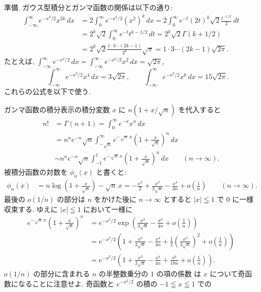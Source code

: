 \documentclass[12pt,twoside]{jarticle}
\theoremstyle{jplain}
\theoremstyle{jplain}
\theoremstyle{jplain}
\numberwithin{theorem}{section}
\numberwithin{equation}{section}
\numberwithin{figure}{section}
\numberwithin{table}{section}
\begin{document}
準備. ガウス型積分とガンマ函数の関係は以下の通り:
\begin{align*}
\int_{-\infty}^\infty e^{-x^2/2}x^{2k}\,dx
&=2\int_0^\infty e^{-x^2/2} (x^2)^k \,dx
=2\int_0^\infty e^{-t} (2t)^k \sqrt{2}\frac{t^{-1/2}}{2}\,dt
\\ &
=2^k\sqrt{2}\int_0^\infty e^{-t} t^{k-1/2}\,dt
=2^k\sqrt{2}\Gamma(k+1/2)
\\ &
=2^k\sqrt{2}\frac{1\cdot3\cdots(2k-1)}{2^k}\sqrt{\pi}
=1\cdot3\cdots(2k-1)\sqrt{2\pi}.
\end{align*}
たとえば, 
\(
\int_{-\infty}^\infty e^{-x^2/2}\,dx
=\int_{-\infty}^\infty e^{-x^2/2}x^2\,dx
=\sqrt{2\pi}
\),
\[
\qquad
\int_{-\infty}^\infty e^{-x^2/2}x^4\,dx = 3\sqrt{2\pi}, \qquad
\int_{-\infty}^\infty e^{-x^2/2}x^6\,dx = 15\sqrt{2\pi}.
\]
これらの公式を以下で使う.

ガンマ函数の積分表示の積分変数 $x$ に $n(1+x/\sqrt{n})$ を代入すると
\begin{align*}
n!
&=\Gamma(n+1)
=\int_0^\infty e^{-x}x^n\,dx
\\ &
=n^n e^{-n}\sqrt{n}
\int_{-\sqrt{n}}^\infty e^{-\sqrt{n}\,x} \left( 1+\frac{x}{\sqrt{n}} \right)^n \,dx
\\ &
\sim n^n e^{-n}\sqrt{n}
\int_{-1}^1 e^{-\sqrt{n}\,x} \left( 1+\frac{x}{\sqrt{n}} \right)^n \,dx
\qquad (n\to\infty).
\end{align*}
被積分函数の対数を $\phi_n(x)$ と書くと:
\begin{align*}
\phi_n(x)
&=n\log\left(1+\frac{x}{\sqrt{n}}\right)-\sqrt{n}\,x
=-\frac{x^2}{2} + \frac{x^3}{3\sqrt{n}}-\frac{x^4}{4n}+ o\left(\frac{1}{n}\right)
\qquad (n\to\infty).
\end{align*}
最後の $o(1/n)$ の部分は $n$ をかけた後に $n\to\infty$ とすると 
$|x|\leqq 1$ で $0$ に一様収束する.
ゆえに $|x|\leqq 1$ において一様に
\begin{align*}
e^{-\sqrt{n}\,x} \left( 1+\frac{x}{\sqrt{n}} \right)^n
&=e^{-x^2/2}
\exp\left( \frac{x^3}{3\sqrt{n}}-\frac{x^4}{4n}+ o\left(\frac{1}{n}\right) \right)
\\ &
=e^{-x^2/2}
\left(
 1
 +\frac{x^3}{3\sqrt{n}}
 -\frac{x^4}{4n}
 +\frac{1}{2}\left( \frac{x^3}{3\sqrt{n}} \right)^2
 +o\left(\frac{1}{n}\right)
\right)
\\ &
=e^{-x^2/2}
\left(
1
+\frac{x^3}{3\sqrt{n}}
-\frac{x^4}{4n}
+\frac{x^6}{18n}
+o\left( \frac{1}{n} \right)
\right).
\end{align*}
$o(1/n)$ の部分に含まれる $n$ の半整数乗分の $1$ の項の係数
は $x$ について奇函数になることに注意せよ. 
奇函数と $e^{-x^2/2}$ の積の $-1\leqq x\leqq 1$ での
\end{document}

